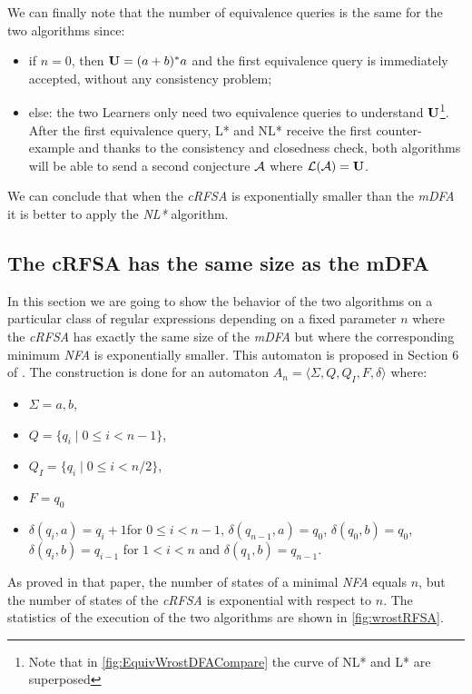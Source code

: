 We can finally note that the number of equivalence queries is the same for the two algorithms since:
\begin{itemize}
  \item if $n = 0$, then $\mathbf{U} = (a+b)^*a$ and the first equivalence query is immediately accepted, without any consistency problem;

  \item else: the two Learners only need two equivalence queries to understand $\mathbf{U}$\footnote{Note that in \cref{fig:EquivWrostDFACompare} the curve of NL* and L* are superposed}. After the first equivalence query, L* and NL* receive the first counter-example and thanks to the consistency and closedness check, both algorithms will be able to send a second conjecture $\mathcal{A}$ where $\mathcal{L}(\mathcal{A}) = \mathbf{U}$.
\end{itemize}

We can conclude that when the \textit{cRFSA} is exponentially smaller than the \textit{mDFA} it is better to apply the \textit{NL*} algorithm.

\subsection{The cRFSA has the same size as the mDFA}
\label{sec:worstRFSA}

In this section we are going to show the behavior of the two algorithms on a particular class of regular expressions depending on a fixed parameter $n$ where the \textit{cRFSA} has exactly the same size of the \textit{mDFA} but where the corresponding minimum \textit{NFA} is exponentially smaller.
This automaton is proposed in Section 6 of \cite{RFSA}. The construction is done for an automaton $A_n = \langle \Sigma, Q, Q_I, F, \delta \rangle $ where:
\begin{itemize}
  \item $\Sigma = {a, b}$,
  \item $Q = \{q_i \mid 0 \leq i < n-1 \}$,
  \item $Q_I = \{q_i \mid 0 \leq i < n/2\}$,
  \item $F = q_0$
  \item $\delta(q_i,a) = q_i+1$for $0 \leq i< n - 1$, $\delta(q_{n-1},a) = q_0$, $\delta(q_0,b)=q_0$, $\delta(q_i,b) = q_{i-1}$ for $1<i<n$ and $\delta(q_1,b)=q_{n-1}$.
\end{itemize}

As proved in that paper, the number of states of a minimal \textit{NFA} equals $n$, but the number of states of the \textit{cRFSA} is exponential with respect to $n$.
The statistics of the execution of the two algorithms are shown in \cref{fig:wrostRFSA}.


